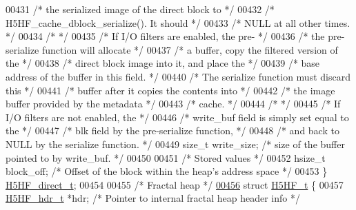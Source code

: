 \begin{DoxyCode}
00431                                 \textcolor{comment}{/* the serialized image of the direct block to */}
00432                                 \textcolor{comment}{/* H5HF\_cache\_dblock\_serialize().  It should   */}
00433                                 \textcolor{comment}{/* NULL at all other times.                    */}
00434                                 \textcolor{comment}{/*                                             */}
00435                                 \textcolor{comment}{/* If I/O filters are enabled, the pre-        */}
00436                                 \textcolor{comment}{/* the pre-serialize function will allocate    */}
00437                                 \textcolor{comment}{/* a buffer, copy the filtered version of the  */}
00438                                 \textcolor{comment}{/* direct block image into it, and place the   */}
00439                                 \textcolor{comment}{/* base address of the buffer in this field.   */}
00440                                 \textcolor{comment}{/* The serialize function must discard this    */}
00441                                 \textcolor{comment}{/* buffer after it copies the contents into    */}
00442                                 \textcolor{comment}{/* the image buffer provided by the metadata   */}
00443                                 \textcolor{comment}{/* cache.                                      */}
00444                                 \textcolor{comment}{/*                                             */}
00445                                 \textcolor{comment}{/* If I/O filters are not enabled, the         */}
00446                                 \textcolor{comment}{/* write\_buf field is simply set equal to the  */}
00447                                 \textcolor{comment}{/* blk field by the pre-serialize function,    */}
00448                                 \textcolor{comment}{/* and back to NULL by the serialize function. */}
00449     \textcolor{keywordtype}{size\_t}  write\_size;     \textcolor{comment}{/* size of the buffer pointed to by write\_buf. */}
00450 
00451     \textcolor{comment}{/* Stored values */}
00452     hsize\_t     block\_off;      \textcolor{comment}{/* Offset of the block within the heap's address space */}
00453 \} \hyperlink{struct_h5_h_f__direct__t}{H5HF\_direct\_t};
00454 
00455 \textcolor{comment}{/* Fractal heap */}
\hyperlink{struct_h5_h_f__t}{00456} \textcolor{keyword}{struct }\hyperlink{struct_h5_h_f__t}{H5HF\_t} \{
00457     \hyperlink{struct_h5_h_f__hdr__t}{H5HF\_hdr\_t}  *hdr;           \textcolor{comment}{/* Pointer to internal fractal heap header info */}

\end{DoxyCode}
